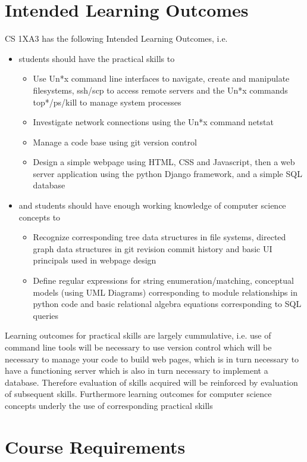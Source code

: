 \documentclass{article}
\begin{document}
\section{Intended Learning Outcomes}
\label{sec:org01cf60f}
CS 1XA3 has the following Intended Learning Outcomes, i.e. 
\begin{itemize}
\item students should have the practical skills to
\begin{itemize}
\item Use Un*x command line interfaces to navigate, create and manipulate
filesystems, ssh/scp to access remote servers and the Un*x commands
top*/ps/kill to manage system processes
\item Investigate network connections using the Un*x command netstat
\item Manage a code base using git version control
\item Design a simple webpage using HTML, CSS and Javascript, then a web server
application using the python Django framework, and a simple SQL database
\end{itemize}

\item and students should have enough working knowledge of computer science concepts to
\begin{itemize}
\item Recognize corresponding tree data structures in file systems, directed graph
data structures in git revision commit history and basic UI principals used
in webpage design
\item Define regular expressions for string enumeration/matching, conceptual
models (using UML Diagrams) corresponding to module relationships in python
code and basic relational algebra equations corresponding to SQL queries
\end{itemize}
\end{itemize}

\noindent
Learning outcomes for practical skills are largely cummulative, i.e. use of
command line tools will be necessary to use version control which will be
necessary to manage your code to build web pages, which is in turn necessary to
have a functioning server which is also in turn necessary to implement a
database. Therefore evaluation of skills acquired will be reinforced by
evaluation of subsequent skills. Furthermore learning outcomes for computer
science concepts underly the use of corresponding practical skills

\section{Course Requirements}
\label{sec:org0faad5c}
\end{document}

